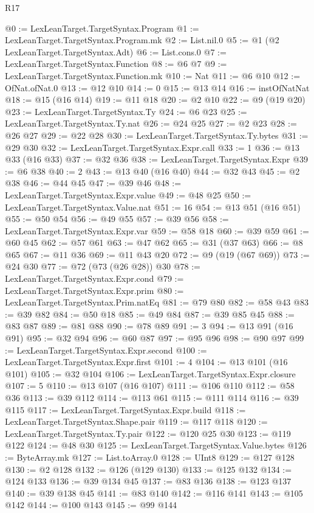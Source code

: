 \begin{lexlean}{R17}
\begin{coremodule}
@0 := LexLeanTarget.TargetSyntax.Program
@1 := LexLeanTarget.TargetSyntax.Program.mk
@2 := List.nil.{0}
@5 := @1 (@2 LexLeanTarget.TargetSyntax.Adt)
@6 := List.cons.{0}
@7 := LexLeanTarget.TargetSyntax.Function
@8 := @6 @7
@9 := LexLeanTarget.TargetSyntax.Function.mk
@10 := Nat
@11 := @6 @10
@12 := OfNat.ofNat.{0}
@13 := @12 @10
@14 := 0
@15 := @13 @14
@16 := instOfNatNat
@18 := @15 (@16 @14)
@19 := @11 @18
@20 := @2 @10
@22 := @9 (@19 @20)
@23 := LexLeanTarget.TargetSyntax.Ty
@24 := @6 @23
@25 := LexLeanTarget.TargetSyntax.Ty.nat
@26 := @24 @25
@27 := @2 @23
@28 := @26 @27
@29 := @22 @28
@30 := LexLeanTarget.TargetSyntax.Ty.bytes
@31 := @29 @30
@32 := LexLeanTarget.TargetSyntax.Expr.call
@33 := 1
@36 := @13 @33 (@16 @33)
@37 := @32 @36
@38 := LexLeanTarget.TargetSyntax.Expr
@39 := @6 @38
@40 := 2
@43 := @13 @40 (@16 @40)
@44 := @32 @43
@45 := @2 @38
@46 := @44 @45
@47 := @39 @46
@48 := LexLeanTarget.TargetSyntax.Expr.value
@49 := @48 @25
@50 := LexLeanTarget.TargetSyntax.Value.nat
@51 := 16
@54 := @13 @51 (@16 @51)
@55 := @50 @54
@56 := @49 @55
@57 := @39 @56
@58 := LexLeanTarget.TargetSyntax.Expr.var
@59 := @58 @18
@60 := @39 @59
@61 := @60 @45
@62 := @57 @61
@63 := @47 @62
@65 := @31 (@37 @63)
@66 := @8 @65
@67 := @11 @36
@69 := @11 @43 @20
@72 := @9 (@19 (@67 @69))
@73 := @24 @30
@77 := @72 (@73 (@26 @28)) @30
@78 := LexLeanTarget.TargetSyntax.Expr.cond
@79 := LexLeanTarget.TargetSyntax.Expr.prim
@80 := LexLeanTarget.TargetSyntax.Prim.natEq
@81 := @79 @80
@82 := @58 @43
@83 := @39 @82
@84 := @50 @18
@85 := @49 @84
@87 := @39 @85 @45
@88 := @83 @87
@89 := @81 @88
@90 := @78 @89
@91 := 3
@94 := @13 @91 (@16 @91)
@95 := @32 @94
@96 := @60 @87
@97 := @95 @96
@98 := @90 @97
@99 := LexLeanTarget.TargetSyntax.Expr.second
@100 := LexLeanTarget.TargetSyntax.Expr.first
@101 := 4
@104 := @13 @101 (@16 @101)
@105 := @32 @104
@106 := LexLeanTarget.TargetSyntax.Expr.closure
@107 := 5
@110 := @13 @107 (@16 @107)
@111 := @106 @110
@112 := @58 @36
@113 := @39 @112
@114 := @113 @61
@115 := @111 @114
@116 := @39 @115
@117 := LexLeanTarget.TargetSyntax.Expr.build
@118 := LexLeanTarget.TargetSyntax.Shape.pair
@119 := @117 @118
@120 := LexLeanTarget.TargetSyntax.Ty.pair
@122 := @120 @25 @30
@123 := @119 @122
@124 := @48 @30
@125 := LexLeanTarget.TargetSyntax.Value.bytes
@126 := ByteArray.mk
@127 := List.toArray.{0}
@128 := UInt8
@129 := @127 @128
@130 := @2 @128
@132 := @126 (@129 @130)
@133 := @125 @132
@134 := @124 @133
@136 := @39 @134 @45
@137 := @83 @136
@138 := @123 @137
@140 := @39 @138 @45
@141 := @83 @140
@142 := @116 @141
@143 := @105 @142
@144 := @100 @143
@145 := @99 @144

\end{coremodule}
\end{lexlean}
